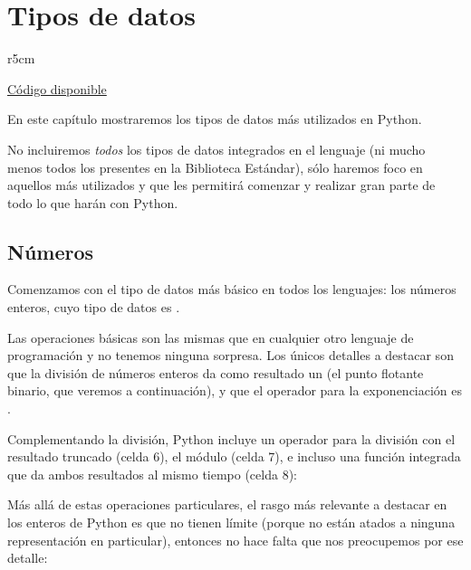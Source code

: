 

\chapter{Tipos de datos}

\begin{wraptable}{r}{5cm}
\begin{modulesinfo}
\begin{center}
{\small
    \href{https://github.com/facundobatista/libro-pyciencia/tree/master/código/py_tipos_datos/}{Código disponible}
}
\end{center}
\end{modulesinfo}
\end{wraptable}

En este capítulo mostraremos los tipos de datos más utilizados en Python.

No incluiremos \textit{todos} los tipos de datos integrados en el lenguaje (ni mucho menos todos los presentes en la Biblioteca Estándar), sólo haremos foco en aquellos más utilizados y que les permitirá comenzar y realizar gran parte de todo lo que harán con Python.

\section{Números}\label{sec:numeros}

Comenzamos con el tipo de datos más básico en todos los lenguajes: los números enteros, cuyo tipo de datos es .

Las operaciones básicas son las mismas que en cualquier otro lenguaje de programación y no tenemos ninguna sorpresa. Los únicos detalles a destacar son que la división de números enteros da como resultado un  (el punto flotante binario, que veremos a continuación), y que el operador para la exponenciación es \mip{**}.


Complementando la división, Python incluye un operador para la división con el resultado truncado (celda 6), el módulo (celda 7), e incluso una función integrada que da ambos resultados al mismo tiempo (celda 8):


Más allá de estas operaciones particulares, el rasgo más relevante a destacar en los enteros de Python es que no tienen límite (porque no están atados a ninguna representación en particular), entonces no hace falta que nos preocupemos por ese detalle:

